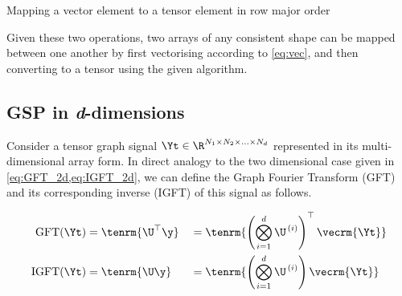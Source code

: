 \begin{algorithm}[b]
    \hypertarget{vectoten}{}
    \label{al:vectoten}
    \caption{Mapping a vector element to a tensor element in row major order}
    \begin{algorithmic}
    \vspace{0.15cm}
    \vspace{0.1cm}
    \vspace{0.25cm}
    \vspace{0.25cm}
    \vspace{0.25cm}
    \vspace{0.15cm}
    \vspace{0.15cm}
    \EndFor
    \vspace{0.25cm}
    \end{algorithmic}
\end{algorithm}



Given these two operations, two arrays of any consistent shape can be mapped between one another by first vectorising according to \cref{eq:vec}, and then converting to a tensor using the given algorithm.



\subsection{GSP in \textit{d}-dimensions}

\label{sec:GSP_dd}

Consider a tensor graph signal $\Yt \in \R^{N_1 \times N_2 \times ... \times N_d}$ represented in its multi-dimensional array form. In direct analogy to the two dimensional case given in \cref{eq:GFT_2d,eq:IGFT_2d}, we can define the Graph Fourier Transform (GFT) and its corresponding inverse (IGFT) of this signal as follows. 

\begin{alignat}{2}
\label{eq:gft_nd}
    \text{GFT}(\Yt) & = \tenrm{\U^\top \y} && = \tenrm{\left(  \bigotimes_{i=1}^d  \U^{\,(i)} \right)^\top \vecrm{\Yt} } \\
\label{eq:igft_nd}
    \text{IGFT}(\Yt) & = \tenrm{\U \y} && = \tenrm{\left(  \bigotimes_{i=1}^d  \U^{\,(i)} \right) \vecrm{\Yt} }
\end{alignat}

